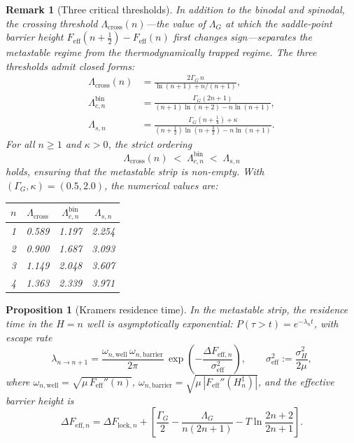 \documentclass[11pt]{article}
\newtheorem{proposition}{Proposition}
\newtheorem{remark}{Remark}
\begin{document}
\begin{remark}[Three critical thresholds]
\label{rmk:three_thresholds}
In addition to the binodal and spinodal, the \emph{crossing threshold}
$\Lambda_{\mathrm{cross}}(n)$---the value of $\Lambda_G$ at which the
saddle-point barrier height $F_{\mathrm{eff}}(n{+}\tfrac{1}{2})-F_{\mathrm{eff}}(n)$
first changes sign---separates the metastable regime from the
thermodynamically trapped regime.
The three thresholds admit closed forms:
\begin{align}
\Lambda_{\mathrm{cross}}(n)
  &= \frac{2\Gamma_G\,n}{\ln(n{+}1) + n/(n{+}1)},
\label{eq:Lambda_cross}\\
\Lambda_{c,n}^{\mathrm{bin}}
  &= \frac{\Gamma_G(2n{+}1)}{(n{+}1)\ln(n{+}2) - n\ln(n{+}1)},
\label{eq:Lambda_bin}\\
\Lambda_{s,n}
  &= \frac{\Gamma_G(n{+}\tfrac{1}{4}) + \kappa}{(n{+}\tfrac{1}{2})\ln(n{+}\tfrac{3}{2}) - n\ln(n{+}1)}.
\label{eq:Lambda_spin}
\end{align}
For all $n \ge 1$ and $\kappa > 0$, the strict ordering
\[
\Lambda_{\mathrm{cross}}(n) \;<\; \Lambda_{c,n}^{\mathrm{bin}} \;<\; \Lambda_{s,n}
\]
holds, ensuring that the metastable strip is non-empty.
With $(\Gamma_G,\kappa) = (0.5,2.0)$, the numerical values are:

\begin{center}
\begin{tabular}{cccc}
\toprule
$n$ & $\Lambda_{\mathrm{cross}}$ & $\Lambda_{c,n}^{\mathrm{bin}}$ & $\Lambda_{s,n}$ \\
\midrule
1 & 0.589 & 1.197 & 2.254 \\
2 & 0.900 & 1.687 & 3.093 \\
3 & 1.149 & 2.048 & 3.607 \\
4 & 1.363 & 2.339 & 3.971 \\
\bottomrule
\end{tabular}
\end{center}
\end{remark}

\begin{proposition}[Kramers residence time]
\label{prop:kramers}
In the metastable strip, the residence time in the $H=n$ well is
asymptotically exponential:
$P(\tau > t) = e^{-\lambda_n t}$, with escape rate
\[
\lambda_{n\to n+1}
= \frac{\omega_{n,\mathrm{well}}\,\omega_{n,\mathrm{barrier}}}{2\pi}\,
  \exp\!\left(-\frac{\Delta F_{\mathrm{eff},n}}{\sigma_{\mathrm{eff}}^2}\right),
\qquad
\sigma_{\mathrm{eff}}^2 := \frac{\sigma_H^2}{2\mu},
\]
where
$\omega_{n,\mathrm{well}} = \sqrt{\mu\,F_{\mathrm{eff}}''(n)}$,
$\omega_{n,\mathrm{barrier}} = \sqrt{\mu\,|F_{\mathrm{eff}}''(H_n^\ddagger)|}$,
and the effective barrier height is
\[
\Delta F_{\mathrm{eff},n}
= \Delta F_{\mathrm{lock},n}
  + \left[\frac{\Gamma_G}{2}
    - \frac{\Lambda_G}{n(2n{+}1)}
    - T\ln\frac{2n{+}2}{2n{+}1}\right].
\]
\end{proposition}
\end{document}
